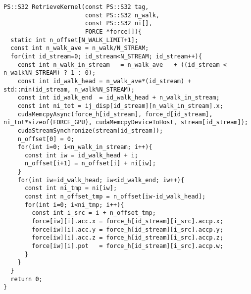 \documentclass[10pt,onecolumn,a4paper,fleqn]{article}
\begin{document}

\begin{mdframed}[
    backgroundcolor=bg,
    topline=false,
    bottomline=false,
    leftline=false,
    rightline=false]
  \begin{verbatim}
PS::S32 RetrieveKernel(const PS::S32 tag,
                       const PS::S32 n_walk,
                       const PS::S32 ni[],
                       FORCE *force[]){
  static int n_offset[N_WALK_LIMIT+1];
  const int n_walk_ave = n_walk/N_STREAM;
  for(int id_stream=0; id_stream<N_STREAM; id_stream++){
    const int n_walk_in_stream   = n_walk_ave   + ((id_stream < n_walk%N_STREAM) ? 1 : 0);
    const int id_walk_head = n_walk_ave*(id_stream) + std::min(id_stream, n_walk%N_STREAM);
    const int id_walk_end  = id_walk_head + n_walk_in_stream;    
    const int ni_tot = ij_disp[id_stream][n_walk_in_stream].x;
    cudaMemcpyAsync(force_h[id_stream], force_d[id_stream], ni_tot*sizeof(FORCE_GPU), cudaMemcpyDeviceToHost, stream[id_stream]);
    cudaStreamSynchronize(stream[id_stream]);
    n_offset[0] = 0;
    for(int i=0; i<n_walk_in_stream; i++){
      const int iw = id_walk_head + i;
      n_offset[i+1] = n_offset[i] + ni[iw];
    }
    for(int iw=id_walk_head; iw<id_walk_end; iw++){
      const int ni_tmp = ni[iw];
      const int n_offset_tmp = n_offset[iw-id_walk_head];
      for(int i=0; i<ni_tmp; i++){
        const int i_src = i + n_offset_tmp;
        force[iw][i].acc.x = force_h[id_stream][i_src].accp.x;
        force[iw][i].acc.y = force_h[id_stream][i_src].accp.y;
        force[iw][i].acc.z = force_h[id_stream][i_src].accp.z;
        force[iw][i].pot   = force_h[id_stream][i_src].accp.w;
      }
    }
  }
  return 0;
}
  \end{verbatim}
\end{mdframed}

\end{document}
